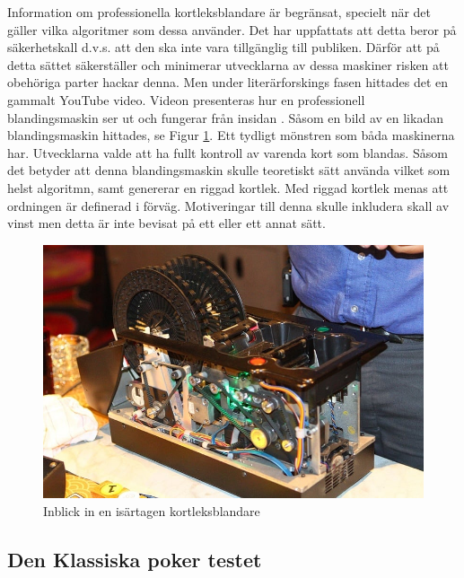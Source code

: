 \documentclass[swedish,a4paper]{article}
\begin{document}
\noindent
\begin{minipage}{0.5\textwidth}
Information om professionella kortleksblandare är 
begränsat, specielt när det gäller vilka algoritmer som dessa
använder. Det 
har uppfattats att detta beror på säkerhetskall d.v.s. att den ska
inte vara tillgänglig till
publiken. Därför att på detta sättet säkerställer och
minimerar utvecklarna av dessa maskiner risken att
obehöriga parter hackar denna. 
Men under literärforskings fasen hittades det en gammalt YouTube 
video. Videon presenteras hur en professionell blandingsmaskin ser ut och
fungerar från insidan \parencite{shufflerVideo}. Såsom en bild av en likadan 
blandingsmaskin hittades, se Figur \ref{fig:casino_shuffler}. Ett 
tydligt mönstren som båda maskinerna har. Utvecklarna valde att ha 
fullt kontroll av varenda kort som blandas. Såsom det betyder att denna
blandingsmaskin skulle teoretiskt sätt använda vilket som helst
algoritmn, samt genererar en riggad kortlek. Med riggad kortlek
menas att ordningen är definerad i förväg. Motiveringar till denna skulle
inkludera skall av vinst men detta är
inte bevisat på ett eller ett annat sätt. 
\end{minipage}%
\hfill
\begin{minipage}{0.5\linewidth}
\begin{figure}[H]
    \centering
    \includegraphics[width=0.9\linewidth]{automatic_card_shuffler.jpg}
    \captionsetup{width=0.5\linewidth}
    \caption{Inblick in en isärtagen kortleksblandare}
    \label{fig:casino_shuffler}
\end{figure}
\end{minipage}

\subsection{Den Klassiska poker testet}
\label{sec:poker_test}
\end{document}
